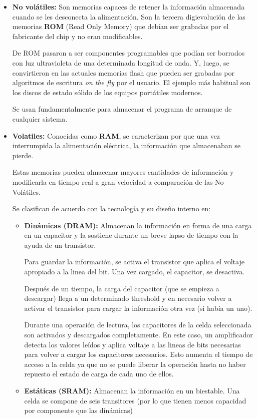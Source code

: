 \begin{itemize}
	\item \textbf{No volátiles:} Son memorias capaces de retener la información almacenada cuando se les desconecta la alimentación. Son la tercera digievolución de las memorias \textbf{ROM} (Read Only Memory) que debían ser grabadas por el fabricante del chip y no eran modificables.
	
	De ROM pasaron a ser componentes programables que podían ser borrados con luz ultravioleta de una determinada longitud de onda. Y, luego, se convirtieron en las actuales memorias flash que pueden ser grabadas por algoritmos de escritura \textit{on the fly} por el usuario. El ejemplo más habitual son los discos de estado sólido de los equipos portátiles modernos.
	
	Se usan fundamentalmente para almacenar el programa de arranque de cualquier sistema.
	
	\item\textbf{Volatiles:} Conocidas como \textbf{RAM}, se caracterizan por que una vez interrumpida la alimentación eléctrica, la información que almacenaban se pierde.
	
	Estas memorias pueden almacenar mayores cantidades de información y modificarla en tiempo real a gran velocidad a comparación de las No Volátiles.
	
	Se clasifican de acuerdo con la tecnología y su diseño interno en:
	
	\begin{itemize}
		\item \textbf{Dinámicas (DRAM):} Almacenan la información en forma de una carga en un capacitor y la sostiene durante un breve lapso de tiempo con la ayuda de un transistor.
		
		Para guardar la información, se activa el transistor que aplica el voltaje apropiado a la linea del bit. Una vez cargado, el capacitor, se desactiva. 
		
		Después de un tiempo, la carga del capacitor (que se empieza a descargar) llega a un determinado threshold y en necesario volver a activar el transistor para cargar la información otra vez (si había un uno).
		
		Durante una operación de lectura, los capacitores de la celda seleccionada son activados y descargados completamente. En este caso, un amplificador detecta los valores leídos y aplica voltaje a las lineas de bits necesarias para volver a cargar
 		los capacitores necesarios. Esto aumenta el tiempo de acceso a la celda ya que no se puede liberar la operación hasta no haber repuesto el estado de carga de cada uno de ellos.
 		\item \textbf{Estáticas (SRAM):} Almacenan la información en un biestable. Una celda se compone de seis transitores (por lo que tienen menos capacidad por componente que las dinámicas)
 		

\end{itemize}
\end{itemize}
